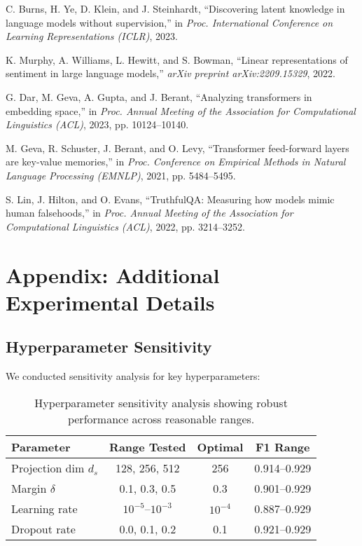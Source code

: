 \documentclass[11pt]{article}
\begin{document}
\begin{thebibliography}{99}
C. Burns, H. Ye, D. Klein, and J. Steinhardt,
``Discovering latent knowledge in language models without supervision,''
in \textit{Proc. International Conference on Learning Representations (ICLR)}, 2023.

K. Murphy, A. Williams, L. Hewitt, and S. Bowman,
``Linear representations of sentiment in large language models,''
\textit{arXiv preprint arXiv:2209.15329}, 2022.

G. Dar, M. Geva, A. Gupta, and J. Berant,
``Analyzing transformers in embedding space,''
in \textit{Proc. Annual Meeting of the Association for Computational Linguistics (ACL)}, 2023, pp. 10124--10140.

M. Geva, R. Schuster, J. Berant, and O. Levy,
``Transformer feed-forward layers are key-value memories,''
in \textit{Proc. Conference on Empirical Methods in Natural Language Processing (EMNLP)}, 2021, pp. 5484--5495.

S. Lin, J. Hilton, and O. Evans,
``TruthfulQA: Measuring how models mimic human falsehoods,''
in \textit{Proc. Annual Meeting of the Association for Computational Linguistics (ACL)}, 2022, pp. 3214--3252.

\end{thebibliography}


\appendix

\section{Appendix: Additional Experimental Details}
\label{app:details}

\subsection{Hyperparameter Sensitivity}

We conducted sensitivity analysis for key hyperparameters:

\begin{table}[h]
\centering
\small
\begin{tabular}{lccc}
\toprule
\textbf{Parameter} & \textbf{Range Tested} & \textbf{Optimal} & \textbf{F1 Range} \\
\midrule
Projection dim $d_s$ & 128, 256, 512 & 256 & 0.914--0.929 \\
Margin $\delta$ & 0.1, 0.3, 0.5 & 0.3 & 0.901--0.929 \\
Learning rate & $10^{-5}$--$10^{-3}$ & $10^{-4}$ & 0.887--0.929 \\
Dropout rate & 0.0, 0.1, 0.2 & 0.1 & 0.921--0.929 \\
\bottomrule
\end{tabular}
\caption{Hyperparameter sensitivity analysis showing robust performance across reasonable ranges.}
\end{table}
\end{document}
